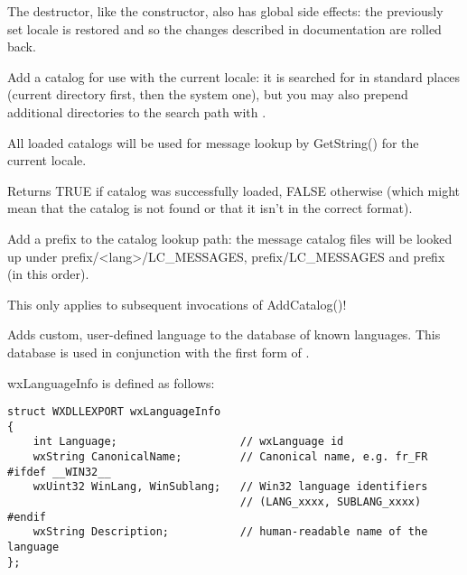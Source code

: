 The destructor, like the constructor, also has global side effects: the previously
set locale is restored and so the changes described in 
 documentation are rolled back.

\label{wxlocaleaddcatalog}


Add a catalog for use with the current locale: it is searched for in standard
places (current directory first, then the system one), but you may also prepend
additional directories to the search path with 
.

All loaded catalogs will be used for message lookup by GetString() for the
current locale.

Returns TRUE if catalog was successfully loaded, FALSE otherwise (which might
mean that the catalog is not found or that it isn't in the correct format).

\label{wxlocaleaddcataloglookuppathprefix}


Add a prefix to the catalog lookup path: the message catalog files will be
looked up under prefix/<lang>/LC\_MESSAGES, prefix/LC\_MESSAGES and prefix
(in this order).

This only applies to subsequent invocations of AddCatalog()!

\label{wxlocaleaddlanguage}


Adds custom, user-defined language to the database of known languages. This
database is used in conjunction with the first form of 
. 

wxLanguageInfo is defined as follows:

\begin{verbatim}
struct WXDLLEXPORT wxLanguageInfo
{
    int Language;                   // wxLanguage id
    wxString CanonicalName;         // Canonical name, e.g. fr_FR
#ifdef __WIN32__
    wxUint32 WinLang, WinSublang;   // Win32 language identifiers
                                    // (LANG_xxxx, SUBLANG_xxxx)
#endif
    wxString Description;           // human-readable name of the language
};
\end{verbatim}


